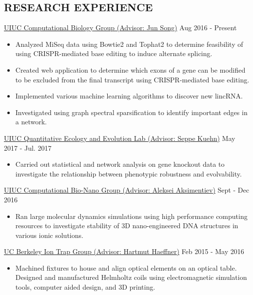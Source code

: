 \documentclass{res}
\begin{document}
\begin{resume}
\section{RESEARCH EXPERIENCE}
\vspace{2pt}
\href{http://song.igb.illinois.edu/}{UIUC Computational Biology Group (Advisor: Jun Song)}  \hfill Aug 2016 - Present
\begin{itemize}%
\item {\normalfont Analyzed MiSeq data using Bowtie2 and Tophat2 to determine feasibility of using CRISPR-mediated base editing to induce alternate splicing. }
\item {\normalfont Created web application to determine which exons of a gene can be modified to be excluded from the final transcript using CRISPR-mediated base editing.}
\item {\normalfont Implemented various machine learning algorithms to discover new lincRNA.}
\item {\normalfont Investigated using graph spectral sparsification to identify important edges in a network.}
\end{itemize}
\href{https://www.kuehnlab.org/}{UIUC Quantitative Ecology and Evolution Lab (Advisor: Seppe Kuehn)} \hfill May 2017 - Jul. 2017
\begin{itemize}
\item {\normalfont Carried out statistical and network analysis on gene knockout data to investigate the relationship between phenotypic robustness and evolvability.}
\end{itemize}
\href{http://bionano.physics.illinois.edu/}{UIUC Computational Bio-Nano Group (Advisor: Aleksei Aksimentiev)} \hfill Sept - Dec 2016\\
\begin{itemize}
\item {\normalfont Ran large molecular dynamics simulations using high performance computing resources to investigate stability of 3D nano-engineered DNA structures in various ionic solutions.}
\end{itemize}
\href{http://research.physics.berkeley.edu/haeffner/}{UC Berkeley Ion Trap Group (Advisor: Hartmut Haeffner)} \hfill Feb 2015 - May 2016\\
\begin{itemize}
\item Machined fixtures to house and align optical elements on an optical table. Designed and manufactured Helmholtz coils using electromagnetic simulation tools, computer aided design, and 3D printing. %

\end{itemize}
\end{resume}
\end{document}
